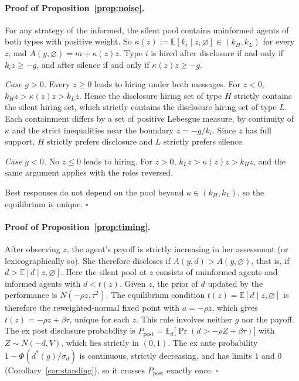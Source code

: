 \documentclass[11pt]{article}
\theoremstyle{definition}
\newcommand{\E}{\mathbb{E}}
\newcommand{\sil}{\varnothing}
\newcommand{\sd}{\sigma_d}
\begin{document}
\paragraph{Proof of Proposition~\ref{prop:noise}.} For any strategy of the informed, the silent pool contains uninformed agents of both types with positive weight. So $\kappa(z):=\E[k_i\mid z,\sil]\in(k_H,k_L)$ for every $z$, and $A(y,\sil)=m+\kappa(z)z$. Type $i$ is hired after disclosure if and only if $k_iz\ge -g$, and after silence if and only if $\kappa(z)z\ge -g$.

\emph{Case $g>0$.} Every $z\ge0$ leads to hiring under both messages. For $z<0$, $k_Hz>\kappa(z)z>k_Lz$. Hence the disclosure hiring set of type $H$ strictly contains the silent hiring set, which strictly contains the disclosure hiring set of type $L$. Each containment differs by a set of positive Lebesgue measure, by continuity of $\kappa$ and the strict inequalities near the boundary $z=-g/k_i$. Since $z$ has full support, $H$ strictly prefers disclosure and $L$ strictly prefers silence.

\emph{Case $g<0$.} No $z\le0$ leads to hiring. For $z>0$, $k_Lz>\kappa(z)z>k_Hz$, and the same argument applies with the roles reversed.

Best responses do not depend on the pool beyond $\kappa\in(k_H,k_L)$, so the equilibrium is unique. \hfill$\square$

\paragraph{Proof of Proposition~\ref{prop:timing}.} After observing $z$, the agent's payoff is strictly increasing in her assessment (or lexicographically so). She therefore discloses if $A(y,d)>A(y,\sil)$, that is, if $d>\E[d\mid z,\sil]$. Here the silent pool at $z$ consists of uninformed agents and informed agents with $d<t(z)$. Given $z$, the prior of $d$ updated by the performance is $N(-\rho z,\tau^2)$. The equilibrium condition $t(z)=\E[d\mid z,\sil]$ is therefore the reweighted-normal fixed point with $a=-\rho z$, which gives $t(z)=-\rho z+\beta\tau$, unique for each $z$. This rule involves neither $g$ nor the payoff. The ex post disclosure probability is $P_{\mathrm{post}}=\E_d\big[\Pr(d>-\rho Z+\beta\tau)\big]$ with $Z\sim N(-d,V)$, which lies strictly in $(0,1)$. The ex ante probability $1-\Phi(d^*(g)/\sd)$ is continuous, strictly decreasing, and has limits $1$ and $0$ (Corollary~\ref{cor:standing}), so it crosses $P_{\mathrm{post}}$ exactly once. \hfill$\square$
\end{document}
